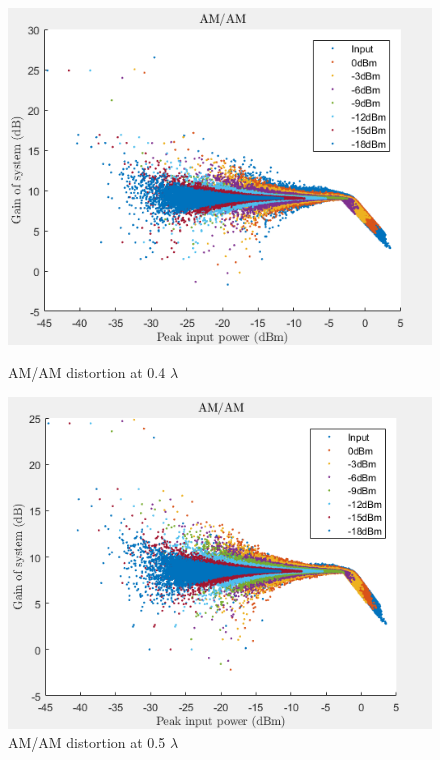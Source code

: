 \begin{figure}[H]
  \centering
  \begin{minipage}[b]{0.5\textwidth}
	\includegraphics[scale = 0.5]{figures/measurement/two_antenna/amam_05.png}
	\caption{AM/AM distortion at 0.4 $\lambda$}
    \label{fig:amam05}
  \end{minipage}
  \hfill
  \begin{minipage}[b]{0.4\textwidth}
\includegraphics[scale = 0.5]{figures/measurement/two_antenna/amam_06.png}
\caption{AM/AM distortion at 0.5 $\lambda$}
    \label{fig:amam06}
  \end{minipage}
\end{figure}


